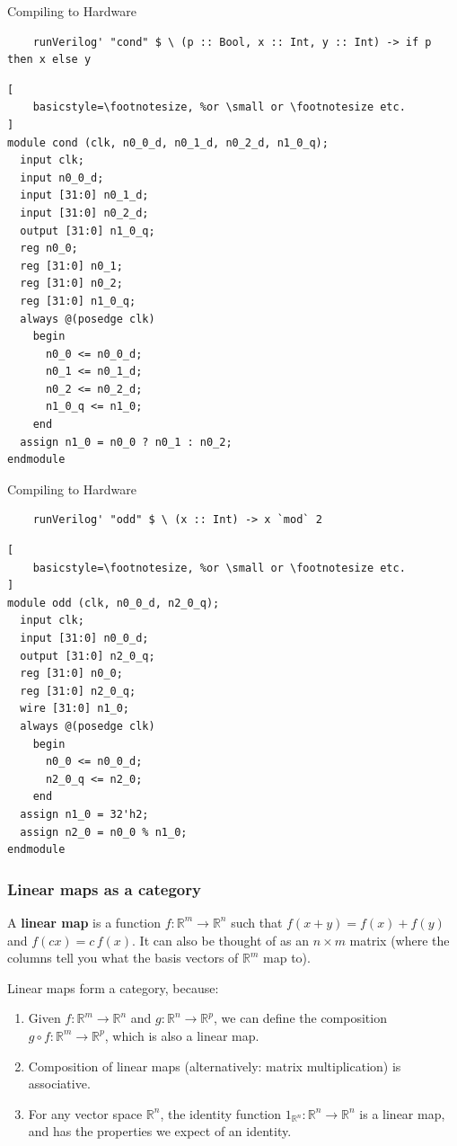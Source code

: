 \documentclass[10pt]{beamer}
\theoremstyle{definition}
\theoremstyle{remark}
\numberwithin{equation}{section}
\begin{document}
\begin{frame}[fragile]{Compiling to Hardware}
  \begin{lstlisting}
    runVerilog' "cond" $ \ (p :: Bool, x :: Int, y :: Int) -> if p then x else y
  \end{lstlisting}
  \begin{lstlisting}[
    basicstyle=\footnotesize, %or \small or \footnotesize etc.
]
module cond (clk, n0_0_d, n0_1_d, n0_2_d, n1_0_q);
  input clk;
  input n0_0_d;
  input [31:0] n0_1_d;
  input [31:0] n0_2_d;
  output [31:0] n1_0_q;
  reg n0_0;
  reg [31:0] n0_1;
  reg [31:0] n0_2;
  reg [31:0] n1_0_q;
  always @(posedge clk)
    begin
      n0_0 <= n0_0_d;
      n0_1 <= n0_1_d;
      n0_2 <= n0_2_d;
      n1_0_q <= n1_0;
    end
  assign n1_0 = n0_0 ? n0_1 : n0_2;
endmodule
  \end{lstlisting}
\end{frame}

\begin{frame}[fragile]{Compiling to Hardware}
  \begin{lstlisting}
    runVerilog' "odd" $ \ (x :: Int) -> x `mod` 2
  \end{lstlisting}
  \begin{lstlisting}[
    basicstyle=\footnotesize, %or \small or \footnotesize etc.
]
module odd (clk, n0_0_d, n2_0_q);
  input clk;
  input [31:0] n0_0_d;
  output [31:0] n2_0_q;
  reg [31:0] n0_0;
  reg [31:0] n2_0_q;
  wire [31:0] n1_0;
  always @(posedge clk)
    begin
      n0_0 <= n0_0_d;
      n2_0_q <= n2_0;
    end
  assign n1_0 = 32'h2;
  assign n2_0 = n0_0 % n1_0;
endmodule
  \end{lstlisting}
\end{frame}

\begin{frame}[fragile]{}
  \frametitle{Linear maps as a category}

  A \textbf{linear map} is a function $f\colon \mathbb{R}^m \rightarrow \mathbb{R}^n$
  such that $f(x + y) = f(x) + f(y)$ and $f(cx) = c\,f(x)$.
  It can also be thought of as an $n \times m$ matrix (where the columns tell you
  what the basis vectors of $\mathbb{R}^m$ map to).

  Linear maps form a category, because:
  \begin{enumerate}
  \item Given $f\colon \mathbb{R}^m \rightarrow \mathbb{R}^n$ and $g\colon \mathbb{R}^n \rightarrow
    \mathbb{R}^p$, we can define the composition $g \circ f \colon \mathbb{R}^m \rightarrow
    \mathbb{R}^p$, which is also a linear map.
  \item Composition of linear maps (alternatively: matrix multiplication) is
    associative.
  \item For any vector space $\mathbb{R}^n$, the identity function
    $1_{\mathbb{R}^n}\colon \mathbb{R}^n \rightarrow \mathbb{R}^n$ is a linear map, and
    has the properties we expect of an identity.
  \end{enumerate}
\end{frame}
\end{document}
